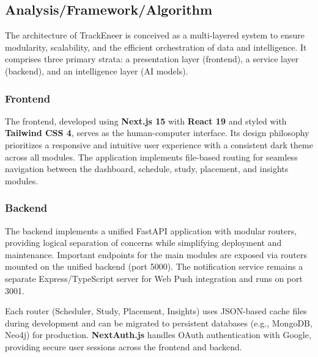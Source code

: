 \documentclass[12pt]{article}
\begin{document}
\subsection{Analysis/Framework/Algorithm}
The architecture of TrackEneer is conceived as a multi-layered system to ensure modularity, scalability, and the efficient orchestration of data and intelligence. It comprises three primary strata: a presentation layer (frontend), a service layer (backend), and an intelligence layer (AI models).

\subsubsection{Frontend}
The frontend, developed using \textbf{Next.js 15} with \textbf{React 19} and styled with \textbf{Tailwind CSS 4}, serves as the human-computer interface. Its design philosophy prioritizes a responsive and intuitive user experience with a consistent dark theme across all modules. The application implements file-based routing for seamless navigation between the dashboard, schedule, study, placement, and insights modules.

\subsubsection{Backend}
The backend implements a unified FastAPI application with modular routers, providing logical separation of concerns while simplifying deployment and maintenance. Important endpoints for the main modules are exposed via routers mounted on the unified backend (port 5000). The notification service remains a separate Express/TypeScript server for Web Push integration and runs on port 3001.

Each router (Scheduler, Study, Placement, Insights) uses JSON-based cache files during development and can be migrated to persistent databases (e.g., MongoDB, Neo4j) for production. \textbf{NextAuth.js} handles OAuth authentication with Google, providing secure user sessions across the frontend and backend.
\end{document}
